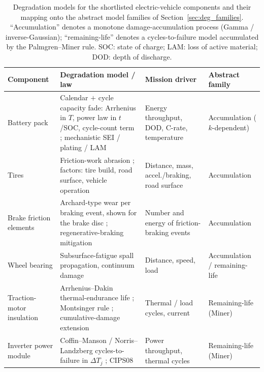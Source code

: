 \documentclass[11pt,a4paper]{article}
\theoremstyle{plain}
\theoremstyle{definition}
\theoremstyle{remark}
\begin{document}
\begin{table}[htbp]
\centering
\caption{Degradation models for the shortlisted electric-vehicle components and their mapping onto the abstract model families of Section~\ref{sec:deg_families}.
``Accumulation'' denotes a monotone damage-accumulation process (Gamma / inverse-Gaussian); ``remaining-life'' denotes a cycles-to-failure model accumulated by the Palmgren--Miner rule.
SOC: state of charge; LAM: loss of active material; DOD: depth of discharge.}
\label{tab:ev_deg_models}
\small
\begin{tabularx}{\linewidth}{@{}>{\hsize=0.744\hsize\raggedright\arraybackslash}X>{\hsize=1.519\hsize\raggedright\arraybackslash}X>{\hsize=0.930\hsize\raggedright\arraybackslash}X>{\hsize=0.806\hsize\raggedright\arraybackslash}X@{}}
\toprule
\rowcolor{headgrey}
\textbf{Component} & \textbf{Degradation model / law} & \textbf{Mission driver} & \textbf{Abstract family} \\
\midrule
Battery pack
  & Calendar $+$ cycle capacity fade: Arrhenius in $T$, power law in $t$/SOC, cycle-count term \cite[Eqs.~1--3]{Hosen2021}; mechanistic SEI / plating / LAM \cite[Sec.~2.1]{Lv2025}
  & Energy throughput, DOD, C-rate, temperature
  & Accumulation ($k$-dependent) \\[3pt]
Tires
  & Friction-work abrasion \cite[Eq.~7]{SchallamachTurner1960}; factors: tire build, road surface, vehicle operation \cite[Sec.~2.1.2]{Fussell2022}
  & Distance, mass, accel./braking, road surface
  & Accumulation \\[3pt]
Brake friction elements
  & Archard-type wear per braking event, shown for the brake disc \cite[Eqs.~21--22]{Sha2022}; regenerative-braking mitigation \cite[Sec.~6.1]{Fussell2022}
  & Number and energy of friction-braking events
  & Accumulation \\[3pt]
Wheel bearing
  & Subsurface-fatigue spall propagation, continuum damage \cite[Sec.~2.1.3]{Ohana2023}
  & Distance, speed, load
  & Accumulation / remaining-life \\[3pt]
Traction-motor insulation
  & Arrhenius--Dakin thermal-endurance life \cite{Dakin1948}; Montsinger rule \cite{Montsinger1930}; cumulative-damage extension \cite[Eqs.~1--2]{Zhang2025insul}
  & Thermal / load cycles, current
  & Remaining-life (Miner) \\[3pt]
Inverter power module
  & Coffin--Manson / Norris--Landzberg cycles-to-failure in $\Delta T_j$ \cite[Eqs.~3--5]{Alavi2024}; CIPS08 \cite[Eq.~(1)]{Bayerer2008}
  & Power throughput, thermal cycles
  & Remaining-life (Miner) \\
\bottomrule
\end{tabularx}
\end{table}
\end{document}
